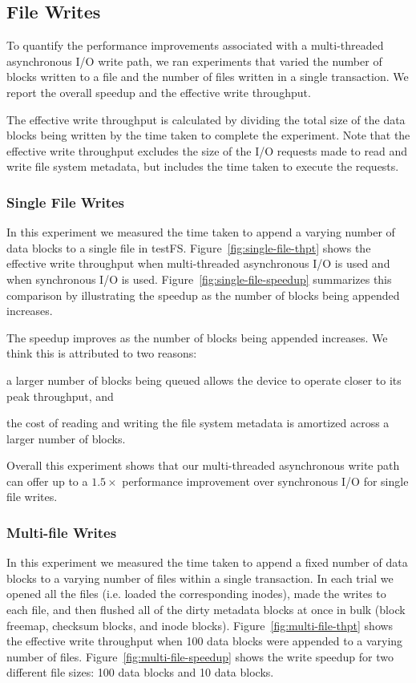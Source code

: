 \subsection{File Writes}
To quantify the performance improvements associated with a multi-threaded
asynchronous I/O write path, we ran experiments that varied the number of
blocks written to a file and the number of files written in a single
transaction. We report the overall speedup and the effective write throughput.

The effective write throughput is calculated by dividing the total size of the
data blocks being written by the time taken to complete the experiment. Note
that the effective write throughput excludes the size of the I/O requests made
to read and write file system metadata, but includes the time taken to execute
the requests.

\subsubsection{Single File Writes}
In this experiment we measured the time taken to append a varying number of
data blocks to a single file in testFS. Figure~\ref{fig:single-file-thpt} shows
the effective write throughput when multi-threaded asynchronous I/O is used and
when synchronous I/O is used. Figure~\ref{fig:single-file-speedup} summarizes
this comparison by illustrating the speedup as the number of blocks being
appended increases.

The speedup improves as the number of blocks being appended increases. We think
this is attributed to two reasons:
\begin{enumerate*}[label={(\roman*)}]
  \item a larger number of blocks being queued allows the device to operate
    closer to its peak throughput, and
  \item the cost of reading and writing the file system metadata is amortized
    across a larger number of blocks.
\end{enumerate*}
Overall this experiment shows that our multi-threaded asynchronous write path
can offer up to a $1.5\times$ performance improvement over synchronous I/O for
single file writes.

\subsubsection{Multi-file Writes}
In this experiment we measured the time taken to append a fixed number of data
blocks to a varying number of files within a single transaction. In each trial
we opened all the files (i.e. loaded the corresponding inodes), made the writes
to each file, and then flushed all of the dirty metadata blocks at once in bulk
(block freemap, checksum blocks, and inode blocks).
Figure~\ref{fig:multi-file-thpt} shows the effective write throughput when
100 data blocks were appended to a varying number of files.
Figure~\ref{fig:multi-file-speedup} shows the write speedup for two different
file sizes: 100 data blocks and 10 data blocks.

